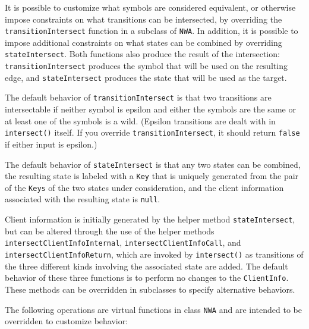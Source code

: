 \antistupidfloats

It is possible to customize what symbols are considered equivalent, or
otherwise impose constraints on what transitions can be intersected, by
overriding the \texttt{transitionIntersect} function in a subclass of
\texttt{NWA}. In addition, it is possible to impose additional constraints on
what states can be combined by overriding \texttt{stateIntersect}. Both
functions also produce the result of the intersection:
\texttt{transitionIntersect} produces the symbol that will be used on the
resulting edge, and \texttt{stateIntersect} produces the state that will be
used as the target.

The default behavior of
\texttt{transitionIntersect} is that two transitions are intersectable if
neither symbol is epsilon and either the symbols are the same or at least one of
the symbols is a wild. (Epsilon transitions are dealt with in
\texttt{intersect()} itself. If you override \texttt{transitionIntersect}, it
should return \texttt{false} if either input is epsilon.)

The default behavior of \texttt{stateIntersect} is that any two
states can be combined, the resulting state is labeled with a
\texttt{Key} that is uniquely generated from the pair of the \texttt{Keys} of
the two states under consideration, and the client information associated
with the resulting state is \texttt{null}.


Client information is initially generated by the helper method \texttt{stateIntersect},
but can be altered through the use of the helper methods
\texttt{intersectClientInfoInternal}, \texttt{intersectClientInfoCall}, and
\texttt{intersect\-Client\-InfoReturn}, which are invoked by
\texttt{intersect()} as transitions of the three different kinds involving the
associated state are added.  The default behavior of these three functions is
to perform no changes to the \texttt{ClientInfo}.  These methods can be
overridden in subclasses to specify alternative behaviors.

\goodbreak
The following operations are virtual functions in class \texttt{NWA} and are intended
to be overridden to customize behavior:

